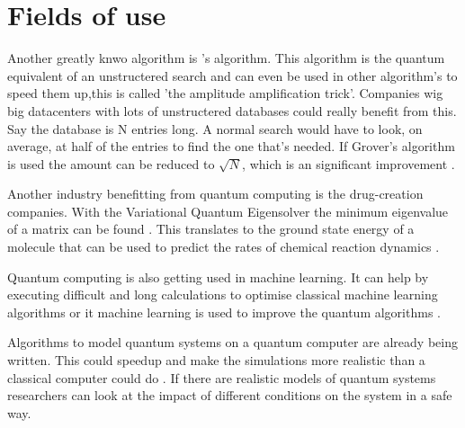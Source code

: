 \section{Fields of use}
\label{sec:Fields of use}
Another greatly knwo algorithm is \textcite{grover}'s algorithm.
This algorithm is the quantum equivalent of an unstructered search and can even be used in other algorithm's to speed them up,this is called 'the amplitude amplification trick'.
Companies wig big datacenters with lots of unstructered databases could really benefit from this. Say the database is N entries long. A normal search would have to look, on average, at half of the entries to find the one that's needed.
If Grover's algorithm is used the amount can be reduced to $\sqrt{N}$, which is an significant improvement \autocite{qiskitgrover}.

Another industry benefitting from quantum computing is the drug-creation companies.
With the Variational Quantum Eigensolver the minimum eigenvalue of a matrix can be found \autocite{simmol}. This translates to the ground state energy of a molecule that can be used to predict the rates of chemical reaction dynamics \autocite{chem}.

Quantum computing is also getting used in machine learning. It can help by executing difficult and long calculations to optimise classical machine learning algorithms or it machine learning is used to improve the quantum algorithms \autocite{qml}.

Algorithms to model quantum systems on a quantum computer are already being written. This could speedup and make the simulations more realistic than a classical computer could do \autocite{simulation}.
If there are realistic models of quantum systems researchers can look at the impact of different conditions on the system in a safe way. 